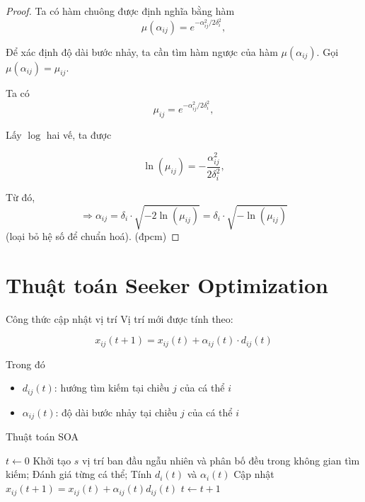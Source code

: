 \documentclass[10pt]{beamer}
\begin{document}
\begin{frame}
\begin{proof}
  Ta có hàm chuông được định nghĩa bằng hàm $$\mu(\alpha_{ij}) = e^{-\alpha_{ij}^2 / 2\delta_i^2},$$

  Để xác định độ dài bước nhảy, ta cần tìm hàm ngược của hàm $\mu(\alpha_{ij})$. Gọi $\mu(\alpha_{ij}) = \mu_{ij}$.

  Ta có $$\mu_{ij} = e^{-\alpha_{ij}^2 / 2\delta_i^2},$$

  Lấy $\log$ hai vế, ta được

  $$\ln(\mu_{ij}) = -\frac{\alpha_{ij}^2}{2\delta_i^2},$$

  Từ đó, $$\Rightarrow \alpha_{ij} = \delta_i \cdot \sqrt{-2 \ln(\mu_{ij})} = \delta_i \cdot \sqrt{-\ln(\mu_{ij})}$$ (loại bỏ hệ số để chuẩn hoá). (đpcm)

\end{proof}
\end{frame}







\section*{Thuật toán Seeker Optimization}




\begin{frame}{Công thức cập nhật vị trí}
    Vị trí mới được tính theo:


    \begin{equation}
    x_{ij}(t + 1) = x_{ij}(t) + \alpha_{ij}(t) \cdot d_{ij}(t)
    \end{equation}

Trong đó
\begin{itemize}
    \item $d_{ij}(t)$: hướng tìm kiếm tại chiều $j$ của cá thể $i$
    \item $\alpha_{ij}(t)$: độ dài bước nhảy tại chiều $j$ của cá thể $i$
\end{itemize}
\end{frame}


\begin{frame}[fragile]{Thuật toán SOA}
\begin{algorithm}[H]
\caption{Thuật toán SOA}
\begin{algorithmic}[1]
  \STATE $t \gets 0$
  \STATE Khởi tạo $s$ vị trí ban đầu ngẫu nhiên và phân bố đều trong không gian tìm kiếm;
  \REPEAT
    \STATE Đánh giá từng cá thể;
      \STATE Tính $d_i(t)$ và $\alpha_i(t)$
      \STATE Cập nhật $x_{ij}(t+1) = x_{ij}(t) + \alpha_{ij}(t)d_{ij}(t)$
    \ENDFOR
    \STATE $t \gets t+1$
\end{algorithmic}
\end{algorithm}
\end{frame}
\end{document}
